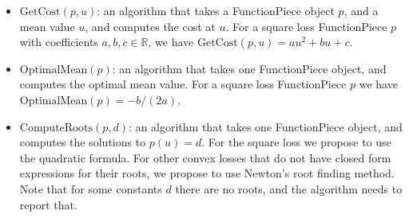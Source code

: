 \documentclass{article}
\newcommand{\RR}{\mathbb R}
\begin{document}
\begin{itemize}
\item $\text{GetCost}(p, u)$: an algorithm that takes a FunctionPiece
  object $p$, and a mean value $u$, and computes the cost at $u$. For
  a square loss FunctionPiece $p$ with coefficients $a,b,c\in\RR$, we
  have $\text{GetCost}(p,u)=au^2+bu+c$.
\item $\text{OptimalMean}(p)$: an algorithm that takes one
  FunctionPiece object, and computes the optimal mean value. For a
  square loss FunctionPiece $p$ we have
  $\text{OptimalMean}(p)=-b/(2a)$.
\item $\text{ComputeRoots}(p, d)$: an algorithm that takes one
  FunctionPiece object, and computes the solutions to $p(u)=d$. For
  the square loss we propose to use the quadratic formula. For other
  convex losses that do not have closed form expressions for their
  roots, we propose to use Newton's root finding method. Note that for
  some constants $d$ there are no roots, and the algorithm needs to
  report that.
\end{itemize}
\end{document}
